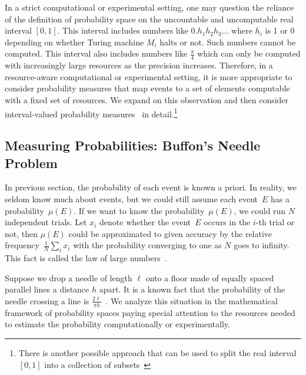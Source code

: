 \documentclass{article}
\theoremstyle{remark}
\newcommand{\pmeas}{\ensuremath{\mu}}
\newcommand{\yutsung}[1]{\fbox{\begin{minipage}{0.9\textwidth}\color{purple}{Yu-Tsung says: #1}\end{minipage}}}
\newcommand{\amr}[1]{\fbox{\begin{minipage}{0.9\textwidth}\color{green}{Amr says: #1}\end{minipage}}}
\begin{document}
In a strict computational or experimental setting, one may question
the reliance of the definition of probability space on the uncountable
and uncomputable real interval $[0,1]$. This interval includes numbers
like $0.h_1h_2h_3\ldots$ where $h_i$ is 1 or 0 depending on whether
Turing machine $M_i$ halts or not. Such numbers cannot be
computed. This interval also includes numbers like $\frac{\pi}{4}$
which can only be computed with increasingly large resources as the
precision increases.
Therefore, in a resource-aware computational or experimental setting,
it is more appropriate to consider probability measures that map
events to a set of elements computable with a fixed set of
resources. We expand on this observation and then consider
interval-valued probability
measures~\cite{Dempster1967,Shafer1976,JamisonLodwick2004}
in detail.\footnote{There is another possible approach that can be
  used to split the real interval $[0,1]$ into a collection of
  subsets~\cite{PuriRalescu1983} \amr{need to explain the
    connection and why we are not using it.}}

\subsection{Measuring Probabilities: Buffon's Needle Problem}
 
In previous section, the probability of each event is known
a priori. In reality, we seldom know much about events, but we could still assume
each event~$E$ has a probability~$\pmeas(E)$. If we want to know the
probability~$\pmeas(E)$, we could run $N$ independent trials. Let $x_{i}$ denote
whether the event~$E$ occurs in the $i$-th trial or not, then $\pmeas(E)$ could
be approximated to given accuracy by the relative
frequency~$\frac{1}{N}\sum_{i}x_{i}$ with the probability converging to one as
$N$ goes to infinity. This fact is called the law of large
numbers~\cite{Bernoulli2006,Kolmogorov1950,Uspensky1937,Shafer1976,544199}.

Suppose we drop a needle of length $\ell$ onto a floor made of equally
spaced parallel lines a distance $h$ apart. It is a known fact that
the probability of the needle crossing a line is
$\frac{2\ell}{\pi h}$~\cite{Buffon1777,DeMorgan1872,Hall1873,Uspensky1937}.
We analyze this situation in the mathematical framework of probability
spaces paying special attention to the resources needed to estimate
the probability computationally or experimentally.
\end{document}
